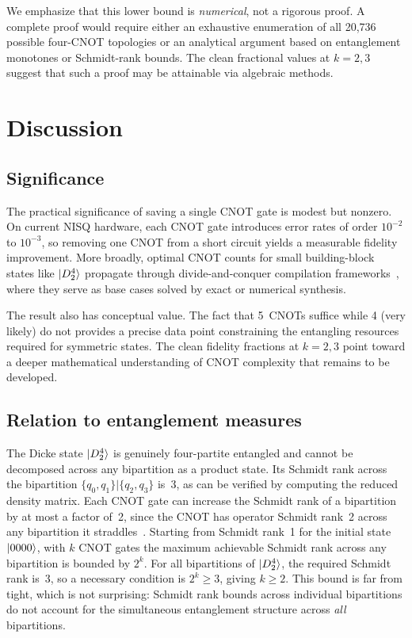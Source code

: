\documentclass[twocolumn,10pt]{article}
\begin{document}
We emphasize that this lower bound is \emph{numerical}, not a rigorous proof.
A complete proof would require either an exhaustive enumeration of all 20,736
possible four-CNOT topologies or an analytical argument based on entanglement
monotones or Schmidt-rank bounds. The clean fractional values at $k=2,3$
suggest that such a proof may be attainable via algebraic methods.

\section{Discussion}
\label{sec:discussion}

\subsection{Significance}

The practical significance of saving a single CNOT gate is modest but
nonzero. On current NISQ hardware, each CNOT gate introduces error rates of
order $10^{-2}$ to $10^{-3}$, so removing one CNOT from a short circuit
yields a measurable fidelity improvement. More broadly, optimal CNOT counts
for small building-block states like $\ket{D_2^4}$ propagate through
divide-and-conquer compilation frameworks~\cite{aktar2022}, where they serve as
base cases solved by exact or numerical synthesis.

The result also has conceptual value. The fact that 5~CNOTs suffice while
4 (very likely) do not provides a precise data point constraining the
entangling resources required for symmetric states. The clean fidelity
fractions at $k=2,3$ point toward a deeper mathematical understanding of
CNOT complexity that remains to be developed.

\subsection{Relation to entanglement measures}

The Dicke state $\ket{D_2^4}$ is genuinely four-partite entangled and
cannot be decomposed across any bipartition as a product state. Its Schmidt
rank across the bipartition $\{q_0, q_1\} | \{q_2, q_3\}$ is~3, as can be
verified by computing the reduced density matrix. Each CNOT gate can increase
the Schmidt rank of a bipartition by at most a factor of~2, since
the CNOT has operator Schmidt rank~2 across any bipartition it
straddles~\cite{NielsenChuang}. Starting from Schmidt rank~1 for the initial
state $\ket{0000}$, with $k$ CNOT gates the maximum achievable Schmidt rank
across any bipartition is bounded by $2^k$. For all bipartitions of
$\ket{D_2^4}$, the required Schmidt rank is~3, so a necessary condition is
$2^k \geq 3$, giving $k \geq 2$. This bound is far from tight, which is not
surprising: Schmidt rank bounds across individual bipartitions do not account
for the simultaneous entanglement structure across \emph{all} bipartitions.
\end{document}
